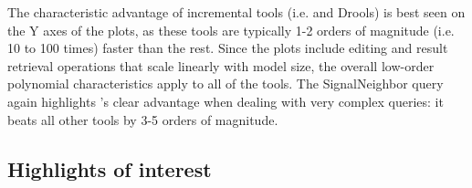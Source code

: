 % 

The characteristic advantage of incremental tools (i.e. \eiq{} and Drools) is best seen on the Y axes of the plots, as these tools are typically 1-2 orders of magnitude (i.e. 10 to 100 times) faster than the rest. Since the plots include editing and result retrieval operations that scale linearly with model size, the overall low-order polynomial characteristics apply to all of the tools. The \textsf{SignalNeighbor} query again highlights \eiq's clear advantage when dealing with very complex queries: it beats all other tools by 3-5 orders of magnitude.


% 

 
 

\subsection{Highlights of interest}

